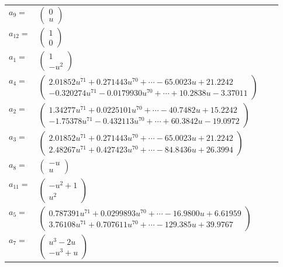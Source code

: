 \documentclass[1p]{elsarticle_modified}
\theoremstyle{definition}
\begin{document}
\begin{tabular}{m{7pt} m{180pt} m{7pt} m{180pt} }
\flushright $a_{9}=$&$\begin{pmatrix}0\\u\end{pmatrix}$ \\
\flushright $a_{12}=$&$\begin{pmatrix}1\\0\end{pmatrix}$ \\
\flushright $a_{1}=$&$\begin{pmatrix}1\\- u^2\end{pmatrix}$ \\
\flushright $a_{4}=$&$\begin{pmatrix}2.01852 u^{71}+0.271443 u^{70}+\cdots-65.0023 u+21.2242\\-0.320274 u^{71}-0.0179930 u^{70}+\cdots+10.2838 u-3.37011\end{pmatrix}$ \\
\flushright $a_{2}=$&$\begin{pmatrix}1.34277 u^{71}+0.0225101 u^{70}+\cdots-40.7482 u+15.2242\\-1.75378 u^{71}-0.432113 u^{70}+\cdots+60.3842 u-19.0972\end{pmatrix}$ \\
\flushright $a_{3}=$&$\begin{pmatrix}2.01852 u^{71}+0.271443 u^{70}+\cdots-65.0023 u+21.2242\\2.48267 u^{71}+0.427423 u^{70}+\cdots-84.8436 u+26.3994\end{pmatrix}$ \\
\flushright $a_{8}=$&$\begin{pmatrix}- u\\u\end{pmatrix}$ \\
\flushright $a_{11}=$&$\begin{pmatrix}- u^2+1\\u^2\end{pmatrix}$ \\
\flushright $a_{5}=$&$\begin{pmatrix}0.787391 u^{71}+0.0299893 u^{70}+\cdots-16.9800 u+6.61959\\3.76108 u^{71}+0.707611 u^{70}+\cdots-129.385 u+39.9767\end{pmatrix}$ \\
\flushright $a_{7}=$&$\begin{pmatrix}u^3-2 u\\- u^3+u\end{pmatrix}$ \\

\end{tabular}
\end{document}
